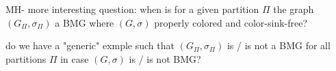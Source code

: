 \documentclass[final,3p,times]{elsarticle}
\newtheorem{lemma}[theorem]{Lemma}%
\newcommand{\TODO}[1]{\begingroup\color{red}#1\endgroup}
\begin{document}
%	


%	 


\TODO{MH- more interesting question: when is for a given partition $\Pi$ the graph $(G_\Pi,\sigma_\Pi)$ a BMG
where $(G,\sigma)$ properly colored and color-sink-free?
 }
 
\TODO{do we have a "generic" exmple such that  $(G_\Pi,\sigma_\Pi)$ is / is not a BMG
for all partitions $\Pi$ in case $(G,\sigma)$ is / is not BMG? } 


\end{document}
